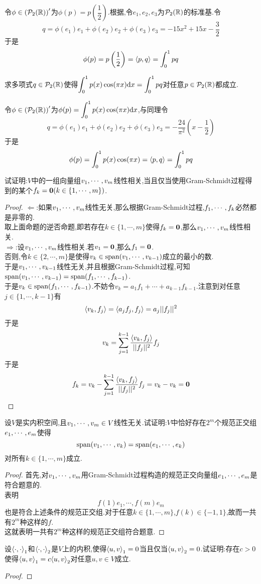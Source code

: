\documentclass{ctexart}
\begin{document}
\begin{solution}
    令$\phi\in\left(\mathcal{P}_2(\mathbb{R})\right)'$为$\phi(p)=p\left(\dfrac12\right)$.根据,令$e_1,e_2,e_3$为$\mathcal{P}_2(\mathbb{R})$的标准基.令
    \[q=\phi(e_1)e_1+\phi(e_2)e_2+\phi(e_3)e_3=-15x^2+15x-\dfrac32\]
    于是
    \[\phi(p)=p\left(\dfrac12\right)=\left\langle{p},{q}\right\rangle=\int_0^1 pq\]
\end{solution}
\begin{problem}[12.]
    求多项式$q\in\mathcal{P}_2(\mathbb{R})$使得$\displaystyle\int_0^1p(x)\cos(\pi x)\mathrm{d} x=\int_0^1pq$对任意$p\in\mathcal{P}_2(\mathbb{R})$都成立.
\end{problem}
\begin{solution}
    令$\phi\in\left(\mathcal{P}_2(\mathbb{R})\right)'$为$\phi(p)=\displaystyle\int_0^1p(x)\cos(\pi x)\mathrm{d} x$,与同理令
    \[q=\phi(e_1)e_1+\phi(e_2)e_2+\phi(e_3)e_3=-\dfrac{24}{\pi^2}\left(x-\dfrac12\right)\]
    于是
    \[\phi(p)=\int_0^1p(x)\cos(\pi x)=\left\langle{p},{q}\right\rangle=\int_0^1 pq\]
\end{solution}
\begin{problem}[13.]
    试证明:$V$中的一组向量组${v}_1,\cdots,{v}_{m}$线性相关,当且仅当使用Gram-Schmidt过程得到的某个$f_k=\mathbf0(k\in\{1,\cdots,m\})$.
\end{problem}
\begin{proof}
    $\Leftarrow$:如果${v}_1,\cdots,{v}_{m}$线性无关,那么根据Gram-Schmidt过程,${f}_1,\cdots,{f}_{k}$必然都是非零的.\\
    取上面命题的逆否命题,即若存在$k\in\{1,\cdots,m\}$使得$f_k=\mathbf0$,那么${v}_1,\cdots,{v}_{m}$线性相关.\\
    $\Rightarrow$:设${v}_1,\cdots,{v}_{m}$线性相关.若$v_1=\mathbf0$,那么$f_1=\mathbf0$.\\
    否则,令$k\in\{2,\cdots,m\}$是使得$v_k\in\text{span}({v}_1,\cdots,{v}_{k-1})$成立的最小的数.\\
    于是${v}_1,\cdots,{v}_{k-1}$线性无关,并且根据Gram-Schmidt过程,可知$\text{span}({v}_1,\cdots,{v}_{k-1})=\text{span}({f}_1,\cdots,{f}_{k-1})$.\\
    于是$v_k\in\text{span}({f}_1,\cdots,{f}_{k-1})$.不妨令$v_k=a_1f_1+\cdots+a_{k-1}f_{k-1}$.注意到对任意$j\in\{1,\cdots,k-1\}$有
    \[\left\langle{v_k},{f_j}\right\rangle=\left\langle{a_jf_j},{f_j}\right\rangle=a_j||f_j||^2\]
    于是
    \[v_k=\sum_{j=1}^{k-1}\dfrac{\left\langle{v_k},{f_j}\right\rangle}{||f_j||^2}f_j\]
    于是
    \[f_k=v_k-\sum_{j=1}^{k-1}\dfrac{\left\langle{v_k},{f_j}\right\rangle}{||f_j||^2}f_j=v_k-v_k=\mathbf0\]
\end{proof}
\begin{problem}[14.]
    设$V$是实内积空间,且${v}_1,\cdots,{v}_{m}\in V$线性无关.试证明:$V$中恰好存在$2^m$个规范正交组${e}_1,\cdots,{e}_{m}$使得
    \[\text{span}({v}_1,\cdots,{v}_{k})=\text{span}({e}_1,\cdots,{e}_{k})\]
    对所有$k\in\{1,\cdots,m\}$成立.
\end{problem}
\begin{proof}
    首先,对${v}_1,\cdots,{v}_{m}$用Gram-Schmidt过程构造的规范正交向量组${e}_1,\cdots,{e}_{m}$是符合题意的.\\
    表明
    \[f(1)e_1,\cdots,f(m)e_m\]
    也是符合上述条件的规范正交组.对于任意$k\in\{1,\cdots,m\}$,$f(k)\in\{-1,1\}$,故而一共有$2^m$种这样的$f$.\\
    这就表明一共有$2^m$种这样的规范正交组符合题意.
\end{proof}
\begin{problem}[15.]
    设${\left\langle{\cdot},{\cdot}\right\rangle}_1$和${\left\langle{\cdot},{\cdot}\right\rangle}_2$是$V$上的内积,使得${\left\langle{u},{v}\right\rangle}_1=0$当且仅当${\left\langle{u},{v}\right\rangle}_2=0$.试证明:存在$c>0$使得${\left\langle{u},{v}\right\rangle}_1=c{\left\langle{u},{v}\right\rangle}_2$对任意$u,v\in V$成立.
\end{problem}
\begin{proof}
    
\end{proof}
\end{document}

